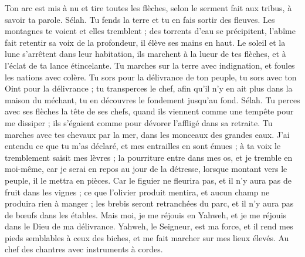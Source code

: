 \begin{multicols}{2}
Ton arc est mis à nu et tire toutes les flèches, selon le serment fait aux tribus, à savoir ta parole. Sélah. Tu fends la terre et tu en fais sortir des fleuves.
Les montagnes te voient et elles tremblent ; des torrents d'eau se précipitent, l'abîme fait retentir sa voix de la profondeur, il élève ses mains en haut.
Le soleil et la lune s'arrêtent dans leur habitation, ils marchent à la lueur de tes flèches, et à l'éclat de ta lance étincelante.
Tu marches sur la terre avec indignation, et foules les nations avec colère.
Tu sors pour la délivrance de ton peuple, tu sors avec ton Oint pour la délivrance ; tu transperces le chef, afin qu'il n'y en ait plus dans la maison du méchant, tu en découvres le fondement jusqu'au fond. Sélah.
Tu perces avec ses flèches la tête de ses chefs, quand ils viennent comme une tempête pour me dissiper ; ils s'égaient comme pour dévorer l'affligé dans sa retraite.
Tu marches avec tes chevaux par la mer, dans les monceaux des grandes eaux.
J'ai entendu ce que tu m'as déclaré, et mes entrailles en sont émues ; à ta voix le tremblement saisit mes lèvres ; la pourriture entre dans mes os, et je tremble en moi-même, car je serai en repos au jour de la détresse, lorsque montant vers le peuple, il le mettra en pièces.
Car le figuier ne fleurira pas, et il n'y aura pas de fruit dans les vignes ; ce que l'olivier produit mentira, et aucun champ ne produira rien à manger ; les brebis seront retranchées du parc, et il n'y aura pas de bœufs dans les étables.
Mais moi, je me réjouis en Yahweh, et je me réjouis dans le Dieu de ma délivrance.
Yahweh, le Seigneur, est ma force, et il rend mes pieds semblables à ceux des biches, et me fait marcher sur mes lieux élevés. Au chef des chantres avec instruments à cordes.
\PPE{}
\end{multicols}
